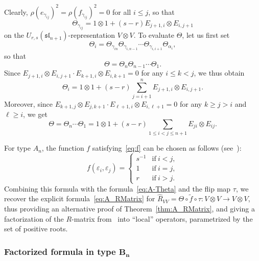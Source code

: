 \documentclass[pdftex]{sigma}
\numberwithin{equation}{section}
\newcommand{\ssl}{\mathfrak{sl}}
\begin{document}
Clearly, $\rho(e_{\gamma_{ij}})^{2} = \rho(f_{\gamma_{ij}})^{2} = 0$ for all $i \le j$, so that
\begin{displaymath}
 \Theta_{\gamma_{ij}} = 1 \otimes 1 + (s - r)E_{j + 1,i} \otimes E_{i,j + 1}
\end{displaymath}
on the $U_{r,s}(\ssl_{n+1})$-representation $V \otimes V$. To evaluate $\Theta$, let us first set
\begin{displaymath}
 \Theta_{i} = \Theta_{\gamma_{in}}\Theta_{\gamma_{i,n-1}}\cdots \Theta_{\gamma_{i,i+1}}\Theta_{\alpha_{i}},
\end{displaymath}
so that
\begin{displaymath}
 \Theta = \Theta_{n}\Theta_{n-1}\cdots \Theta_{1}.
\end{displaymath}
Since $E_{j + 1,i} \otimes E_{i,j + 1} \cdot E_{k + 1,i} \otimes E_{i,k + 1} = 0$ for any $i\leq k < j$, we thus obtain
\begin{displaymath}
 \Theta_{i} = 1 \otimes 1 + (s - r)\sum_{j = i + 1}^{n} E_{j + 1,i} \otimes E_{i,j + 1}.
\end{displaymath}
Moreover, since $E_{k + 1,j} \otimes E_{j,k + 1} \cdot E_{\ell + 1,i} \otimes E_{i,\ell + 1} = 0$ for any $k \geq j > i$ and $\ell \geq i$, we get
\begin{equation}\label{eq:A-Theta}
 \Theta = \Theta_{n}\cdots \Theta_{1} = 1 \otimes 1 + (s - r)\sum_{1 \le i < j \le n + 1} E_{ji} \otimes E_{ij}.
\end{equation}

For type $A_{n}$, the function $f$ satisfying~\eqref{eq:f} can be chosen as follows (see~\cite[Lemma~4.4]{BW1}):
\begin{displaymath}
 f(\varepsilon_{i},\varepsilon_{j}) =
 \begin{cases}
 s^{-1} & \text{if}\ i < j, \\
 1 & \text{if}\ i = j, \\
 r & \text{if}\ i > j.
 \end{cases}
\end{displaymath}
Combining this formula with the formula~\eqref{eq:A-Theta} and the flip map $\tau$, we recover the explicit formula~\eqref{eq:A_RMatrix} for $\hat{R}_{VV}=\Theta \circ \widetilde{f} \circ \tau\colon V \otimes V \to V \otimes V$, thus providing an alternative proof of Theorem~\ref{thm:A_RMatrix}, and giving a factorization of the $R$-matrix from~\cite{BW2} into ``local'' operators, parametrized by the set of positive roots.

\subsubsection[Factorized formula in type B\_n]{Factorized formula in type $\boldsymbol{B_{n}}$}
\end{document}

